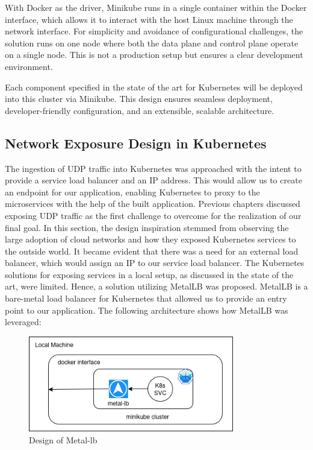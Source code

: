 With Docker as the driver, Minikube runs in a single container within the Docker interface, which allows it to interact with the host Linux machine through the network interface. For simplicity and avoidance of configurational challenges, the solution runs on one node where both the data plane and control plane operate on a single node. This is not a production setup but ensures a clear development environment.

Each component specified in the state of the art for Kubernetes will be deployed into this cluster via Minikube. This design ensures seamless deployment, developer-friendly configuration, and an extensible, scalable architecture.


\subsection{Network Exposure Design in Kubernetes}
The ingestion of UDP traffic into Kubernetes was approached with the intent to provide a service load balancer and an IP address. This would allow us to create an endpoint for our application, enabling Kubernetes to proxy to the microservices with the help of the built application. Previous chapters discussed exposing UDP traffic as the first challenge to overcome for the realization of our final goal. In this section, the design inspiration stemmed from observing the large adoption of cloud networks and how they exposed Kubernetes services to the outside world. It became evident that there was a need for an external load balancer, which would assign an IP to our service load balancer. The Kubernetes solutions for exposing services in a local setup, as discussed in the state of the art, were limited. Hence, a solution utilizing MetalLB was proposed. MetalLB is a bare-metal load balancer for Kubernetes that allowed us to provide an entry point to our application. The following architecture shows how MetalLB was leveraged:



\begin{figure}[H]
\caption{Design of Metal-lb}
\centering
\includegraphics[width=0.8\textwidth]{Design/metal.png}
\end{figure}

